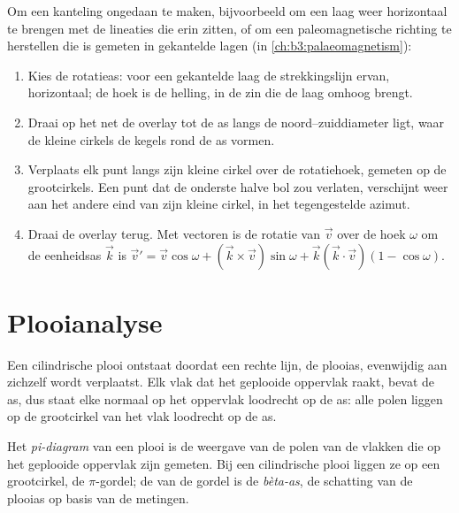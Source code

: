 \begin{method}\label{met:b3:structural-analysis:rotation}
Om een kanteling ongedaan te maken, bijvoorbeeld om een laag weer horizontaal te brengen met de
lineaties die erin zitten, of om een paleomagnetische richting te herstellen die is gemeten in
gekantelde lagen (in \cref{ch:b3:palaeomagnetism}):
\begin{enumerate}
  \item Kies de rotatieas: voor een gekantelde laag de strekkingslijn ervan, horizontaal;
        de hoek is de helling, in de zin die de laag omhoog brengt.
  \item Draai op het net de overlay tot de as langs de
        noord--zuiddiameter ligt, waar de kleine cirkels de kegels rond de
        as vormen.
  \item Verplaats elk punt langs zijn kleine cirkel over de rotatiehoek,
        gemeten op de grootcirkels. Een punt dat de onderste halve bol zou verlaten,
        verschijnt weer aan het andere eind van zijn kleine cirkel, in het
        tegengestelde azimut.
  \item Draai de overlay terug. Met vectoren is de rotatie van $\vec v$ over de
        hoek $\omega$ om de eenheidsas $\vec k$ is $\vec v' = \vec v
        \cos\omega + (\vec k\times\vec v)\sin\omega + \vec k(\vec k\cdot\vec
        v)(1 - \cos\omega)$.
\end{enumerate}
\end{method}

\section{Plooianalyse}\label{sec:b3:structural-analysis:folds}

Een cilindrische plooi ontstaat doordat een rechte lijn, de plooias,
evenwijdig aan zichzelf wordt verplaatst. Elk vlak dat het geplooide oppervlak raakt, bevat de as,
dus staat elke normaal op het oppervlak loodrecht op de as:
alle polen liggen op de grootcirkel van het vlak loodrecht op de as.

\begin{definition}\label{def:b3:structural-analysis:pi}
Het \emph{pi-diagram} van een plooi is de weergave van de polen van
de vlakken die op het geplooide oppervlak zijn gemeten. Bij een cilindrische plooi liggen ze op
een grootcirkel, de $\pi$-gordel; de  van de gordel is de
\emph{bèta-as}, de schatting van de plooias op basis van de
metingen.
\end{definition}

